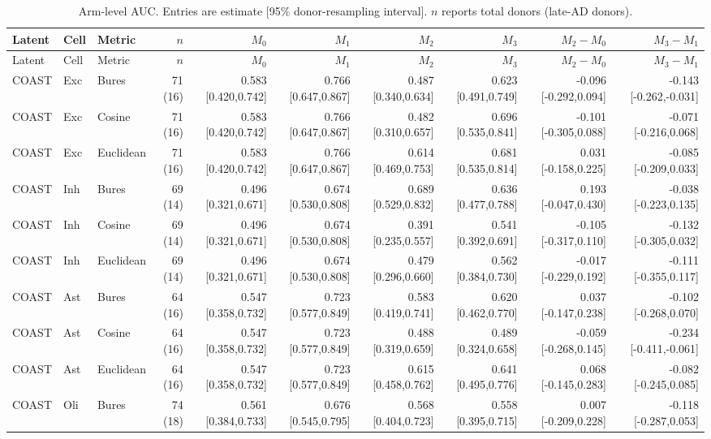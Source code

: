 \documentclass[9pt]{article}
\begin{document}
\begin{landscape}
\scriptsize
\begin{longtable}{lllrrrrrrr}
\caption{Arm-level AUC. Entries are estimate [95\% donor-resampling interval]. $n$ reports total donors (late-AD donors).}\\
\toprule
Latent & Cell & Metric & $n$ & $M_0$ & $M_1$ & $M_2$ & $M_3$ & $M_2-M_0$ & $M_3-M_1$ \\
\midrule
\endfirsthead
\toprule
Latent & Cell & Metric & $n$ & $M_0$ & $M_1$ & $M_2$ & $M_3$ & $M_2-M_0$ & $M_3-M_1$ \\
\midrule
\endhead
COAST & Exc & Bures & 71 (16) & 0.583 [0.420,0.742] & 0.766 [0.647,0.867] & 0.487 [0.340,0.634] & 0.623 [0.491,0.749] & -0.096 [-0.292,0.094] & -0.143 [-0.262,-0.031] \\
COAST & Exc & Cosine & 71 (16) & 0.583 [0.420,0.742] & 0.766 [0.647,0.867] & 0.482 [0.310,0.657] & 0.696 [0.535,0.841] & -0.101 [-0.305,0.088] & -0.071 [-0.216,0.068] \\
COAST & Exc & Euclidean & 71 (16) & 0.583 [0.420,0.742] & 0.766 [0.647,0.867] & 0.614 [0.469,0.753] & 0.681 [0.535,0.814] & 0.031 [-0.158,0.225] & -0.085 [-0.209,0.033] \\
COAST & Inh & Bures & 69 (14) & 0.496 [0.321,0.671] & 0.674 [0.530,0.808] & 0.689 [0.529,0.832] & 0.636 [0.477,0.788] & 0.193 [-0.047,0.430] & -0.038 [-0.223,0.135] \\
COAST & Inh & Cosine & 69 (14) & 0.496 [0.321,0.671] & 0.674 [0.530,0.808] & 0.391 [0.235,0.557] & 0.541 [0.392,0.691] & -0.105 [-0.317,0.110] & -0.132 [-0.305,0.032] \\
COAST & Inh & Euclidean & 69 (14) & 0.496 [0.321,0.671] & 0.674 [0.530,0.808] & 0.479 [0.296,0.660] & 0.562 [0.384,0.730] & -0.017 [-0.229,0.192] & -0.111 [-0.355,0.117] \\
COAST & Ast & Bures & 64 (16) & 0.547 [0.358,0.732] & 0.723 [0.577,0.849] & 0.583 [0.419,0.741] & 0.620 [0.462,0.770] & 0.037 [-0.147,0.238] & -0.102 [-0.268,0.070] \\
COAST & Ast & Cosine & 64 (16) & 0.547 [0.358,0.732] & 0.723 [0.577,0.849] & 0.488 [0.319,0.659] & 0.489 [0.324,0.658] & -0.059 [-0.268,0.145] & -0.234 [-0.411,-0.061] \\
COAST & Ast & Euclidean & 64 (16) & 0.547 [0.358,0.732] & 0.723 [0.577,0.849] & 0.615 [0.458,0.762] & 0.641 [0.495,0.776] & 0.068 [-0.145,0.283] & -0.082 [-0.245,0.085] \\
COAST & Oli & Bures & 74 (18) & 0.561 [0.384,0.733] & 0.676 [0.545,0.795] & 0.568 [0.404,0.723] & 0.558 [0.395,0.715] & 0.007 [-0.209,0.228] & -0.118 [-0.287,0.053] \\

\end{longtable}
\end{landscape}
\end{document}
